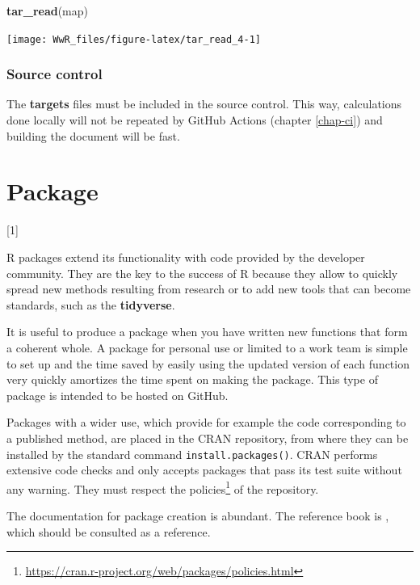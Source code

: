 \documentclass[
  12pt,
  american,
  a4paper,
  extrafontsizes,onecolumn,openright
  ]{memoir}
\newenvironment{Shaded}{\begin{snugshade}}{\end{snugshade}}
\newcommand{\FunctionTok}[1]{\textcolor[rgb]{0.13,0.29,0.53}{\textbf{#1}}}
\newcommand{\NormalTok}[1]{#1}
\newlength{\rf}
\newcommand{\toc}[1]{%
  \startcontents[chapters]%
  \printcontents[chapters]{}{1}[#1]{}%
  ~\newline%
}
\begin{document}
\begin{Shaded}
\begin{Highlighting}[]
\FunctionTok{tar\_read}\NormalTok{(map)}
\end{Highlighting}
\end{Shaded}

\begin{center}\texttt{[image: WwR\_files/figure-latex/tar\_read\_4-1]} \end{center}

\normalsize

\subsection{Source control}\label{source-control-1}

The \textbf{targets} files must be included in the source control.
This way, calculations done locally will not be repeated by GitHub Actions (chapter \ref{chap-ci}) and building the document will be fast.

\chapter{Package}\label{chap-package}

\toc{1}

R packages extend its functionality with code provided by the developer community.
They are the key to the success of R because they allow to quickly spread new methods resulting from research or to add new tools that can become standards, such as the \textbf{tidyverse}.

It is useful to produce a package when you have written new functions that form a coherent whole.
A package for personal use or limited to a work team is simple to set up and the time saved by easily using the updated version of each function very quickly amortizes the time spent on making the package.
This type of package is intended to be hosted on GitHub.

Packages with a wider use, which provide for example the code corresponding to a published method, are placed in the CRAN repository, from where they can be installed by the standard command \texttt{install.packages()}.
CRAN performs extensive code checks and only accepts packages that pass its test suite without any warning.
They must respect the policies\footnote{\url{https://cran.r-project.org/web/packages/policies.html}} of the repository.

The documentation for package creation is abundant.
The reference book is \textcite{Wickham2015}, which should be consulted as a reference.
\end{document}

